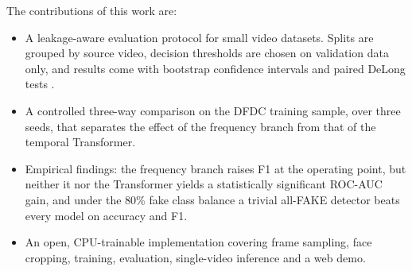 \documentclass[conference]{IEEEtran}
\begin{document}
The contributions of this work are:
\begin{itemize}
\item A leakage-aware evaluation protocol for small video datasets. Splits
  are grouped by source video, decision thresholds are chosen on validation
  data only, and results come with bootstrap confidence intervals and paired
  DeLong tests \cite{delong1988auc}.
\item A controlled three-way comparison on the DFDC training sample, over
  three seeds, that separates the effect of the frequency branch from that of
  the temporal Transformer.
\item Empirical findings: the frequency branch raises F1 at the operating
  point, but neither it nor the Transformer yields a statistically
  significant ROC-AUC gain, and under the 80\% fake class balance a trivial
  all-FAKE detector beats every model on accuracy and F1.
\item An open, CPU-trainable implementation covering frame sampling, face
  cropping, training, evaluation, single-video inference and a web demo.
\end{itemize}
\end{document}

